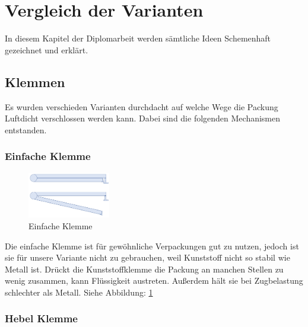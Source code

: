 \section{Vergleich der Varianten}

In diesem Kapitel der Diplomarbeit werden sämtliche Ideen Schemenhaft gezeichnet und erklärt.
 
\subsection{Klemmen}

Es wurden verschieden Varianten durchdacht auf welche Wege die Packung Luftdicht verschlossen werden kann. Dabei sind die folgenden Mechanismen entstanden.

\subsubsection{Einfache Klemme}

\begin{figure}
\vspace{-20pt}
  \begin{center}
    \includegraphics[width=0.32\textwidth]{Bilder/Powerpoint/Einfach_Klemme}
  \end{center}
  \caption{Einfache Klemme}
  \label{Einfache Klemme}
  \vspace{-10pt}
\end{figure}

Die einfache Klemme ist für gewöhnliche Verpackungen gut zu nutzen, jedoch ist sie für unsere Variante nicht zu gebrauchen, weil Kunststoff nicht so stabil wie Metall ist. Drückt die Kunststoffklemme die Packung an manchen Stellen zu wenig zusammen, kann Flüssigkeit austreten. Außerdem hält sie bei Zugbelastung schlechter als Metall. Siehe Abbildung: \ref{Einfache Klemme}

\subsubsection{Hebel Klemme} 


